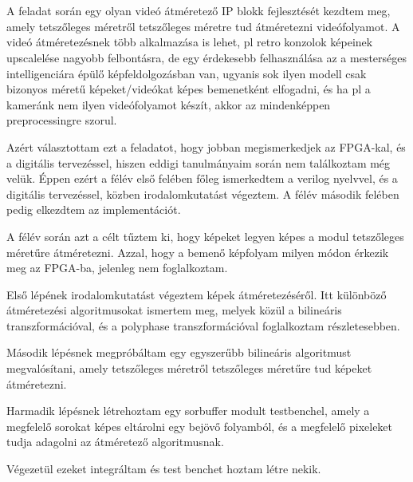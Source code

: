 \chapter{\bevezetes}

A feladat során egy olyan videó átméretező IP blokk fejlesztését kezdtem meg, amely tetszőleges méretről tetszőleges méretre tud átméretezni videófolyamot. A videó átméretezésnek több alkalmazása is lehet, pl retro konzolok képeinek upscalelése nagyobb felbontásra, de egy érdekesebb felhasználása az a mesterséges intelligenciára épülő képfeldolgozásban van, ugyanis sok ilyen modell csak bizonyos méretű képeket/videókat képes bemenetként elfogadni, és ha pl a kameránk nem ilyen videófolyamot készít, akkor az mindenképpen preprocessingre szorul.

Azért választottam ezt a feladatot, hogy jobban megismerkedjek az FPGA-kal, és a digitális tervezéssel, hiszen eddigi tanulmányaim során nem találkoztam még velük. Éppen ezért a félév első felében főleg ismerkedtem a verilog nyelvvel, és a digitális tervezéssel, közben irodalomkutatást végeztem. A félév második felében pedig elkezdtem az implementációt.

A félév során azt a célt tűztem ki, hogy képeket legyen képes a modul tetszőleges méretűre átméretezni. Azzal, hogy a bemenő képfolyam milyen módon érkezik meg az FPGA-ba, jelenleg nem foglalkoztam.

Első lépének irodalomkutatást végeztem képek átméretezéséről. Itt különböző átméretezési algoritmusokat ismertem meg, melyek közül a bilineáris transzformációval, és a polyphase transzformációval foglalkoztam részletesebben.
 
Második lépésnek megpróbáltam egy egyszerűbb bilineáris algoritmust megvalósítani, amely tetszőleges méretről tetszőleges méretűre tud képeket átméretezni.

Harmadik lépésnek létrehoztam egy sorbuffer modult testbenchel, amely a megfelelő sorokat képes eltárolni egy bejövő folyamból, és a megfelelő pixeleket tudja adagolni az átméretező algoritmusnak.

Végezetül ezeket integráltam és test benchet hoztam létre nekik.